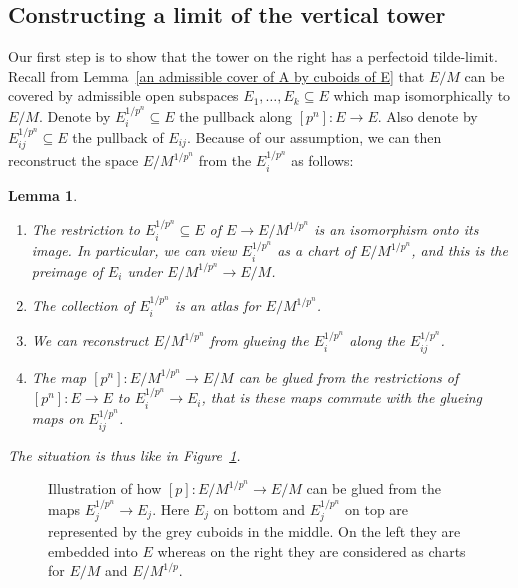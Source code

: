 \documentclass[11pt,oneside]{amsart}
\newtheorem{lemma}[theorem]{Lemma}
\theoremstyle{definition}
\theoremstyle{remark}
\begin{document}
		\subsection{Constructing a limit of the vertical tower}
		
		Our first step is to show that the tower on the right has a perfectoid tilde-limit.
		Recall from Lemma~\ref{an admissible cover of A by cuboids of E} that $E/M$ can be covered by admissible open subspaces $E_1,\dots,E_k\subseteq E$ which map isomorphically to $E/M$. Denote by $E_i^{1/p^n}\subseteq E$ the pullback along $[p^n]:E\rightarrow E$. Also denote by $E_{ij}^{1/p^n}\subseteq E$ the pullback of $E_{ij}$. Because of our assumption, we can then reconstruct the space $E/M^{1/p^n}$ from the $E_i^{1/p^n}$ as follows:
		\begin{lemma}\label{compatible cuboid charts for the tower over E/M}
			\leavevmode
			\begin{enumerate}
		\item The restriction to $E_{i}^{1/p^n}\subseteq E$ of $E\rightarrow E/M^{1/p^n}$ is an isomorphism onto its image. In particular, we can view $E_{i}^{1/p^n}$ as a chart of $E/M^{1/p^n}$, and this is the preimage of $E_i$ under $E/M^{1/p^n}\rightarrow E/M$.
		\item The collection of  $E_{i}^{1/p^n}$ is an atlas for  $E/M^{1/p^n}$. 
		\item We can reconstruct $E/M^{1/p^n}$ from glueing the $E_{i}^{1/p^n}$ along the $E_{ij}^{1/p^n}$.
		\item The map $[p^n]:E/M^{1/p^n}\rightarrow E/M$ can be glued from the restrictions of $[p^n]:E\rightarrow E$ to $E_{i}^{1/p^n}\rightarrow E_{i}$, that is these maps commute with the glueing maps on $E_{ij}^{1/p^n}$.
		\end{enumerate}
		The situation is thus like in Figure~\ref{transform-glue-cover-tikzpicture}.
		\end{lemma}
			\begin{figure}
				
				\caption{Illustration of how $[p]:E/M^{1/p^n}\rightarrow E/M$ can be glued from the maps $E_j^{1/p^n}\rightarrow E_j$. Here $E_j$ on bottom and $E_j^{1/p^n}$ on top are represented by the grey cuboids in the middle. On the left they are embedded into $E$ whereas on the right they are considered as charts for $E/M$ and $E/M^{1/p}$.}
				\label{transform-glue-cover-tikzpicture}
			\end{figure}
\end{document}
